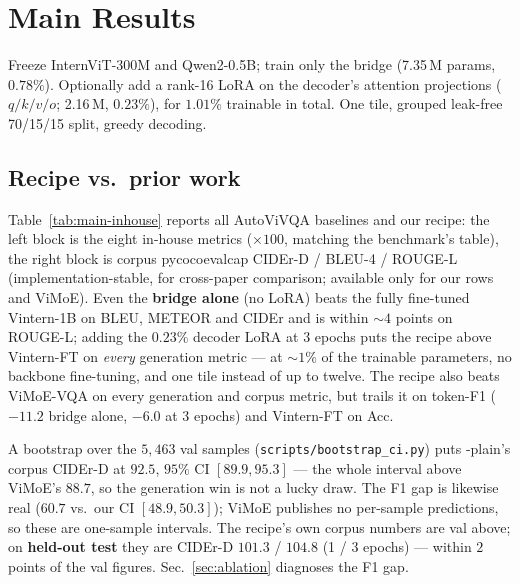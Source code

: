 \section{Main Results}
\label{sec:results}

Freeze InternViT-300M and Qwen2-0.5B; train only the \multitoken{} bridge
(7.35\,M params, $0.78\%$). Optionally add a rank-16 LoRA on the decoder's
attention projections ($q/k/v/o$; 2.16\,M, $0.23\%$), for $1.01\%$ trainable in
total. One tile, grouped leak-free 70/15/15 split, greedy decoding.

\subsection{Recipe vs.\ prior work}
\label{sec:results-main}

Table~\ref{tab:main-inhouse} reports all AutoViVQA baselines and our recipe: the
left block is the eight in-house metrics ($\times 100$, matching the benchmark's
table), the right block is corpus pycocoevalcap CIDEr-D / BLEU-4 / ROUGE-L
(implementation-stable, for cross-paper comparison; available only for our rows
and ViMoE). Even the \textbf{bridge alone} (no LoRA) beats the fully fine-tuned
Vintern-1B on BLEU, METEOR and CIDEr and is within ${\sim}4$ points on ROUGE-L;
adding the $0.23\%$ decoder LoRA at 3 epochs puts the recipe above Vintern-FT on
\emph{every} generation metric --- at ${\sim}1\%$ of the trainable parameters, no
backbone fine-tuning, and one tile instead of up to twelve. The recipe also beats
ViMoE-VQA on every generation and corpus metric, but trails it on token-F1
($-11.2$ bridge alone, $-6.0$ at 3 epochs) and Vintern-FT on Acc.

A bootstrap over the $5{,}463$ val samples (\texttt{scripts/bootstrap\_ci.py})
puts \multitoken{}-plain's corpus CIDEr-D at $92.5$, $95\%$ CI $[89.9, 95.3]$ ---
the whole interval above ViMoE's $88.7$, so the generation win is not a lucky
draw. The F1 gap is likewise real ($60.7$ vs.\ our CI $[48.9, 50.3]$); ViMoE
publishes no per-sample predictions, so these are one-sample intervals. The
recipe's own corpus numbers are val above; on \textbf{held-out test} they are
CIDEr-D $101.3$ / $104.8$ (1 / 3 epochs) --- within $2$ points of the val
figures. Sec.~\ref{sec:ablation} diagnoses the F1 gap.

